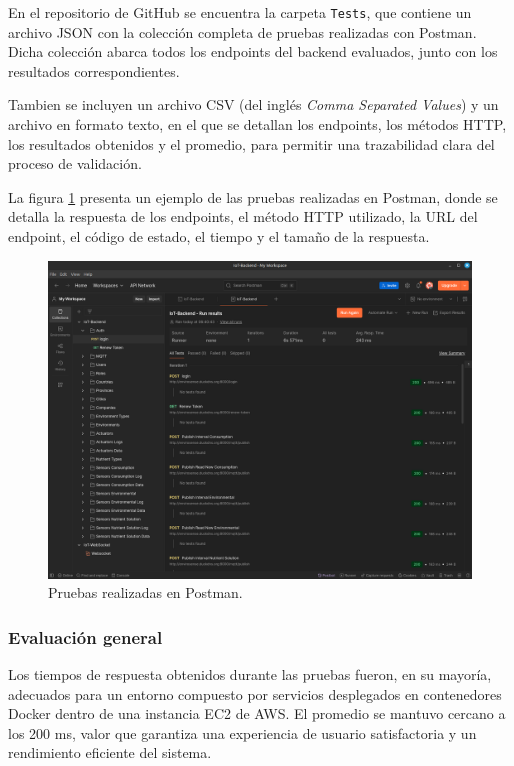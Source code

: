 En el repositorio de GitHub \cite{EnviroSenseIoT} se encuentra la carpeta
\texttt{Tests}, que contiene un archivo JSON con la colección completa de
pruebas realizadas con Postman. Dicha colección abarca todos los endpoints del
backend evaluados, junto con los resultados correspondientes.

Tambien se incluyen un archivo CSV (del inglés \textit{Comma Separated Values})
y un archivo en formato texto, en el que se detallan los endpoints, los métodos
HTTP, los resultados obtenidos y el promedio, para permitir una trazabilidad
clara del proceso de validación.

La figura \ref{fig:postman} presenta un ejemplo de las pruebas realizadas en
Postman, donde se detalla la respuesta de los endpoints, el método HTTP
utilizado, la URL del endpoint, el código de estado, el tiempo y el tamaño de
la respuesta.

\begin{figure}[H]
    \centering
    \includegraphics[width=\textwidth]{Images/38_postman.png}
    \caption[Pruebas realizadas en Postman]{Pruebas realizadas en Postman.}
    \label{fig:postman}
\end{figure}

\subsubsection{Evaluación general}

Los tiempos de respuesta obtenidos durante las pruebas fueron, en su mayoría,
adecuados para un entorno compuesto por servicios desplegados en contenedores
Docker dentro de una instancia EC2 de AWS. El promedio se mantuvo cercano a los
200 ms, valor que garantiza una experiencia de usuario satisfactoria y un
rendimiento eficiente del sistema.

